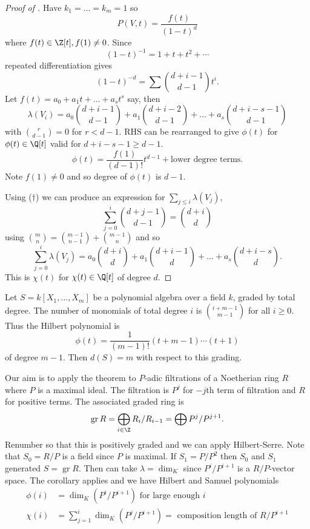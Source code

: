 \documentclass[a4paper]{article}
\DeclareMathOperator{\gr}{gr} %
\begin{document}
\begin{proof}[Proof of ]
  Have \(k_1 = \dots = k_m = 1\) so
  \[
    P(V, t) = \frac{f(t)}{(1 - t)^d}
  \]
  where \(f(t) \in \Z[t], f(1) \neq 0\). Since
  \[
    (1 - t)^{-1} = 1 + t + t^2 + \cdots
  \]
  repeated differentiation gives
  \[
    (1 - t)^{-d} = \sum \binom{d + i - 1}{d - 1} t^i.
  \]
  Let \(f(t) = a_0 + a_1 t + \dots + a_s t^s\) say, then
  \[
    \lambda(V_i) = a_0 \binom{d + i - 1}{d - 1} + a_1 \binom{d + i - 2}{d - 1} + \dots + a_s \binom{d + i - s - 1}{d - 1}
    \tag{\(\dagger\)}
  \]
  with \(\binom{r}{d - 1} = 0\) for \(r < d - 1\). RHS can be rearranged to give \(\phi(t)\) for \(\phi(t) \in \Q[t]\) valid for \(d + i - s - 1 \geq d - 1\).
  \[
    \phi(t) = \frac{f(1)}{(d - 1)!} t^{d - 1} + \text{lower degree terms}.
  \]
  Note \(f(1) \neq 0\) and so degree of \(\phi(t)\) is \(d - 1\).

  Using (\(\dagger\)) we can produce an expression for \(\sum_{j \leq i} \lambda(V_j)\),
  \[
    \sum_{j = 0}^i \binom{d + j - 1}{d - 1} = \binom{d + i}{d}
  \]
  using \(\binom{m}{n} = \binom{m - 1}{n - 1} + \binom{m - 1}{n}\) and so
  \[
    \sum_{j = 0}^i \lambda(V_j) = a_0 \binom{d + i}{d} + a_1 \binom{d + i - 1}{d} + \dots + a_s \binom{d + i - s}{d}.
  \]
  This is \(\chi(t)\) for \(\chi(t) \in \Q[t]\) of degree \(d\).
\end{proof}

\begin{eg}
  Let \(S = k[X_1, \dots, X_m]\) be a polynomial algebra over a field \(k\), graded by total degree. The number of monomials of total degree \(i\) is \(\binom{i + m - 1}{m - 1}\) for all \(i \geq 0\). Thus the Hilbert polynomial is
  \[
    \phi(t) = \frac{1}{(m - 1)!} (t + m - 1) \cdots (t + 1)
  \]
  of degree \(m - 1\). Then \(d(S) = m\) with respect to this grading.
\end{eg}

Our aim is to apply the theorem to \(P\)-adic filtrations of a Noetherian ring \(R\) where \(P\) is a maximal ideal. The filtration is \(P^j\) for \(-j\)th term of filtration and \(R\) for positive terms. The associated graded ring is
\[
  \gr R = \bigoplus_{i \in \Z} R_i/R_{i - 1} = \bigoplus P^j/P^{j + 1}.
\]
Renumber so that this is positively graded and we can apply Hilbert-Serre. Note that \(S_0 = R/P\) is a field since \(P\) is maximal. If \(S_1 = P/P^2\) then \(S_0\) and \(S_1\) generated \(S = \gr R\). Then can take \(\lambda = \dim_K\) since \(P^i/P^{i + 1}\) is a \(R/P\)-vector space. The corollary applies and we have Hilbert and Samuel polynomials
\begin{align*}
  \phi(i) &= \dim_K(P^i/P^{i + 1}) \text{ for large enough } i \\
  \chi(i) &= \sum_{j = 1}^i \dim_K(P^j/P^{i + 1}) = \text{ composition length of } R/P^{i + 1}
\end{align*}
\end{document}
